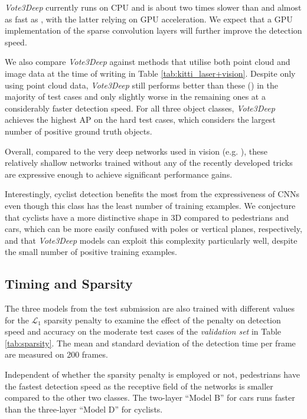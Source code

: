 \documentclass[letterpaper, 10 pt, conference]{tex_style/ieeeconf}
\begin{document}
\emph{Vote3Deep} currently runs on CPU and is about two times slower than \cite{wang2015voting} and almost as fast as \cite{livehicle}, with the latter relying on GPU acceleration.
We expect that a GPU implementation of the sparse convolution layers will further improve the detection speed.

We also compare \emph{Vote3Deep} against methods that utilise both point cloud and image data at the time of writing in Table \ref{tab:kitti_laser+vision}.
Despite only using point cloud data, \emph{Vote3Deep} still performs better than these (\cite{gonzalez2015multiview,premebida2014pedestrian}) in the majority of test cases and only slightly worse in the remaining ones at a considerably faster detection speed.
For all three object classes, \emph{Vote3Deep} achieves the highest AP on the hard test cases, which considers the largest number of positive ground truth objects.

Overall, compared to the very deep networks used in vision (e.g. \cite{simonyan2014very, szegedy2015going, he2015deep}), these relatively shallow networks trained without any of the recently developed tricks are expressive enough to achieve significant performance gains.

Interestingly, cyclist detection benefits the most from the expressiveness of CNNs even though this class has the least number of training examples.
We conjecture that cyclists have a more distinctive shape in 3D compared to pedestrians and cars, which can be more easily confused with poles or vertical planes, respectively, and that \emph{Vote3Deep} models can exploit this complexity particularly well, despite the small number of positive training examples.

\subsection{Timing and Sparsity}
\label{sec:timing}

The three models from the test submission are also trained with different values for the $\mathcal{L}_1$ sparsity penalty to examine the effect of the penalty on detection speed and accuracy on the moderate test cases of the \emph{validation set} in Table \ref{tab:sparsity}.
The mean and standard deviation of the detection time per frame are measured on 200 frames.

Independent of whether the sparsity penalty is employed or not, pedestrians have the fastest detection speed as the receptive field of the networks is smaller compared to the other two classes.
The two-layer ``Model B'' for cars runs faster than the three-layer ``Model D'' for cyclists.
\end{document}
